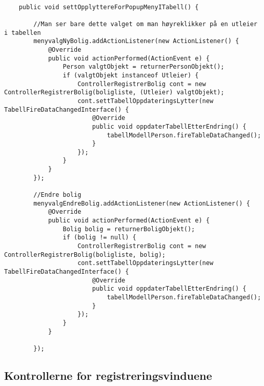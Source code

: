 \begin{lstlisting}[caption=Funksjonaliteten til to av menyvalgene i pop-up menyen.,label=kode:eks2]

    public void settOpplyttereForPopupMenyITabell() {

        //Man ser bare dette valget om man høyreklikker på en utleier i tabellen
        menyvalgNyBolig.addActionListener(new ActionListener() {
            @Override
            public void actionPerformed(ActionEvent e) {
                Person valgtObjekt = returnerPersonObjekt();
                if (valgtObjekt instanceof Utleier) {
                    ControllerRegistrerBolig cont = new ControllerRegistrerBolig(boligliste, (Utleier) valgtObjekt);
                    cont.settTabellOppdateringsLytter(new TabellFireDataChangedInterface() {
                        @Override
                        public void oppdaterTabellEtterEndring() {
                            tabellModellPerson.fireTableDataChanged();
                        }
                    });
                }
            }
        });

        //Endre bolig
        menyvalgEndreBolig.addActionListener(new ActionListener() {
            @Override
            public void actionPerformed(ActionEvent e) {
                Bolig bolig = returnerBoligObjekt();
                if (bolig != null) {
                    ControllerRegistrerBolig cont = new ControllerRegistrerBolig(boligliste, bolig);
                    cont.settTabellOppdateringsLytter(new TabellFireDataChangedInterface() {
                        @Override
                        public void oppdaterTabellEtterEndring() {
                            tabellModellPerson.fireTableDataChanged();
                        }
                    });
                }
            }

        });

\end{lstlisting}




\subsection{Kontrollerne for registreringsvinduene} \label{sec:regkontrollere}


